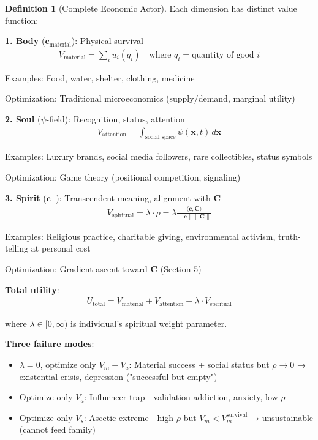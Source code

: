 \documentclass[11pt,a4paper]{article}
\theoremstyle{definition}
\newtheorem{definition}{Definition}[section]
\theoremstyle{remark}
\newcommand{\cc}{\mathbf{c}}
\begin{document}
\begin{enumerate}
\begin{definition}[Complete Economic Actor]
Each dimension has distinct value function:

\textbf{1. Body} (\(\cc_{\text{material}}\)): Physical survival
\begin{align}
V_{\text{material}} = \sum_i u_i(q_i) \quad \text{where } q_i = \text{quantity of good } i
\end{align}

Examples: Food, water, shelter, clothing, medicine

Optimization: Traditional microeconomics (supply/demand, marginal utility)

\textbf{2. Soul} (\(\psi\)-field): Recognition, status, attention
\begin{align}
V_{\text{attention}} = \int_{\text{social space}} \psi(\mathbf{x}, t) \, d\mathbf{x}
\end{align}

Examples: Luxury brands, social media followers, rare collectibles, status symbols

Optimization: Game theory (positional competition, signaling)

\textbf{3. Spirit} (\(\cc_\perp\)): Transcendent meaning, alignment with \(\mathbf{C}\)
\begin{align}
V_{\text{spiritual}} = \lambda \cdot \rho = \lambda \frac{\langle \cc, \mathbf{C} \rangle}{\|\cc\| \|\mathbf{C}\|}
\end{align}

Examples: Religious practice, charitable giving, environmental activism, truth-telling at personal cost

Optimization: Gradient ascent toward \(\mathbf{C}\) (Section 5)

\textbf{Total utility}:
\begin{align}
U_{\text{total}} = V_{\text{material}} + V_{\text{attention}} + \lambda \cdot V_{\text{spiritual}}
\end{align}

where \(\lambda \in [0, \infty)\) is individual's spiritual weight parameter.

\textbf{Three failure modes}:
\begin{itemize}
    \item \(\lambda = 0\), optimize only \(V_m + V_a\): Material success + social status but \(\rho \to 0\) → existential crisis, depression ("successful but empty")
    \item Optimize only \(V_a\): Influencer trap—validation addiction, anxiety, low \(\rho\)
    \item Optimize only \(V_s\): Ascetic extreme—high \(\rho\) but \(V_m < V_m^{\text{survival}}\) → unsustainable (cannot feed family)
\end{itemize}


\end{definition}
\end{enumerate}
\end{document}
